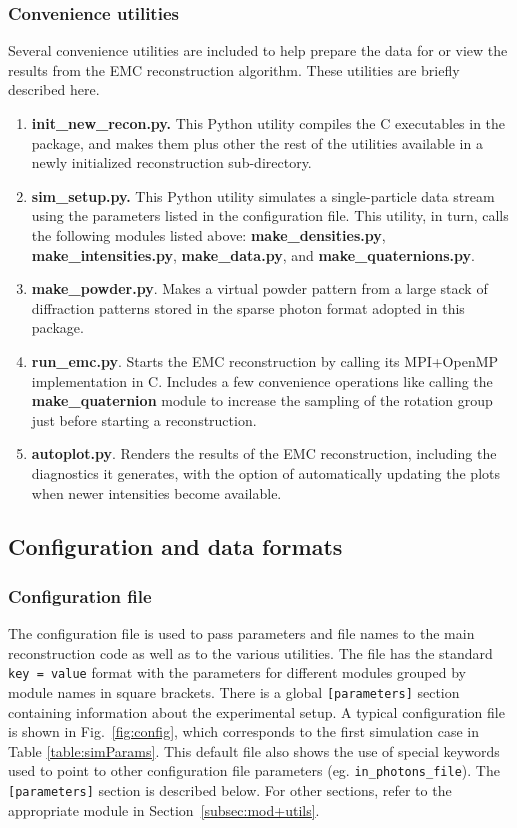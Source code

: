 \documentclass[]{iucr}              %
\begin{document}
\subsubsection{Convenience utilities}\label{subsubsec:utils}
Several convenience utilities are included to help prepare the data for or view the results from the EMC reconstruction algorithm. These utilities are briefly described here. 
\begin{enumerate}
\item{\bf init\_new\_recon.py.} This Python utility compiles the C executables in the package, and makes them plus other the rest of the utilities available in a newly initialized reconstruction sub-directory.
\item{\bf sim\_setup.py.} This Python utility simulates a single-particle data stream using the parameters listed in the configuration file. This utility, in turn, calls the following modules listed above: {\bf make\_densities.py}, {\bf make\_intensities.py}, {\bf make\_data.py}, and {\bf make\_quaternions.py}.
\item{\bf make\_powder.py}. Makes a virtual powder pattern from a large stack of diffraction patterns stored in the sparse photon format adopted in this package.
\item{\bf run\_emc.py}. Starts the EMC reconstruction by calling its MPI+OpenMP implementation in C. Includes a few convenience operations like calling the {\bf make\_quaternion} module to increase the sampling of the rotation group just before starting a reconstruction.
\item{\bf autoplot.py}. Renders the results of the EMC reconstruction, including the diagnostics it generates, with the option of automatically updating the plots when newer intensities become available.
\end{enumerate}


\subsection{Configuration and data formats}\label{subsec:formats}
\subsubsection{Configuration file}\label{subsubsec:config}
The configuration file is used to pass parameters and file names to the main reconstruction code as well as to the various utilities. The file has the standard \texttt{key = value} format with the parameters for different modules grouped by module names in square brackets. There is a global \texttt{[parameters]} section containing information about the experimental setup. A typical configuration file is shown in Fig.~\ref{fig:config}, which corresponds to the first simulation case in Table \ref{table:simParams}. This default file also shows the use of special keywords used to point to other configuration file parameters (eg. \texttt{in\_photons\_file}). The \texttt{[parameters]} section is described below. For other sections, refer to the appropriate module in Section~\ref{subsec:mod+utils}.
\end{document}
